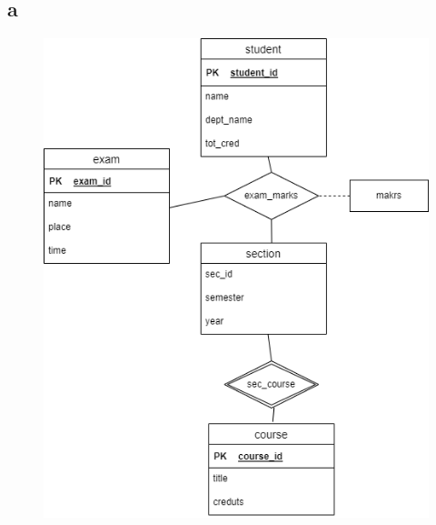 \documentclass{article}
\begin{document}
    \subsection*{a}
    \begin{figure}[H]
        \centering
        \includegraphics[width=\textwidth]{img/52.png}
    \end{figure}
\end{document}
